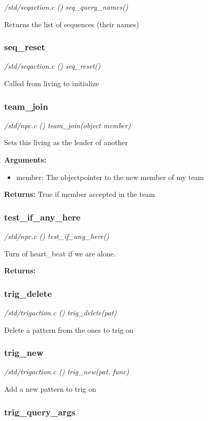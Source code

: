{\em /std/seqaction.c () seq\_query\_names()}

Returns the list of sequences (their names)


\subsubsection{seq\_reset}

{\em /std/seqaction.c () seq\_reset()}

Called from living to initialize


\subsubsection{team\_join}

{\em /std/npc.c () team\_join(object member)}

Sets this living as the leader of another

{\bf Arguments:}
\begin{itemize}
\item     member: The objectpointer to the new member of my team
\end{itemize}

{\bf Returns:}        True if member accepted in the team


\subsubsection{test\_if\_any\_here}

{\em /std/npc.c () test\_if\_any\_here()}

Turn of heart\_beat if we are alone.

{\bf Returns:} 


\subsubsection{trig\_delete}

{\em /std/trigaction.c () trig\_delete(pat)}

Delete a pattern from the ones to trig on


\subsubsection{trig\_new}

{\em /std/trigaction.c () trig\_new(pat, func)}

Add a new pattern to trig on


\subsubsection{trig\_query\_args}

